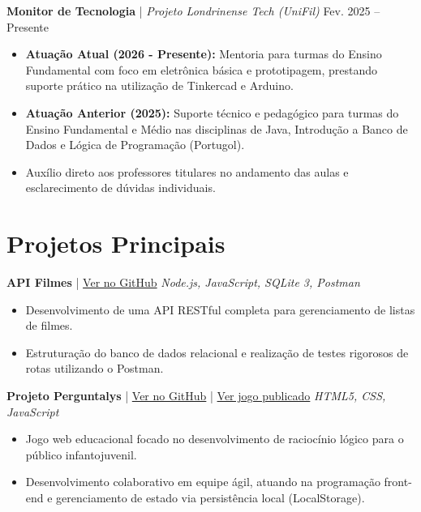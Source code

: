 \documentclass[11pt,a4paper]{article}
\begin{document}
\vspace{2mm}

\textbf{Monitor de Tecnologia} | \textit{Projeto Londrinense Tech (UniFil)} \hfill Fev. 2025 -- Presente
\begin{itemize}[leftmargin=*]
    \item \textbf{Atuação Atual (2026 - Presente):} Mentoria para turmas do Ensino Fundamental com foco em eletrônica básica e prototipagem, prestando suporte prático na utilização de Tinkercad e Arduino.
    \item \textbf{Atuação Anterior (2025):} Suporte técnico e pedagógico para turmas do Ensino Fundamental e Médio nas disciplinas de Java, Introdução a Banco de Dados e Lógica de Programação (Portugol).
    \item Auxílio direto aos professores titulares no andamento das aulas e esclarecimento de dúvidas individuais.
\end{itemize}

\section*{Projetos Principais}

\textbf{API Filmes} | \href{https://github.com/Thiago-Stein/trabalhoFinalAPI}{Ver no GitHub} \hfill \textit{Node.js, JavaScript, SQLite 3, Postman}
\begin{itemize}[leftmargin=*]
    \item Desenvolvimento de uma API RESTful completa para gerenciamento de listas de filmes.
    \item Estruturação do banco de dados relacional e realização de testes rigorosos de rotas utilizando o Postman.
\end{itemize}

\textbf{Projeto Perguntalys} | \href{https://github.com/Thiago-Stein/jogo-perguntalys}{Ver no GitHub} | \href{https://thiago-stein.github.io/jogo-perguntalys/}{Ver jogo publicado} \hfill \textit{HTML5, CSS, JavaScript}
\begin{itemize}[leftmargin=*]
    \item Jogo web educacional focado no desenvolvimento de raciocínio lógico para o público infantojuvenil.
    \item Desenvolvimento colaborativo em equipe ágil, atuando na programação front-end e gerenciamento de estado via persistência local (LocalStorage).
\end{itemize}
\end{document}
